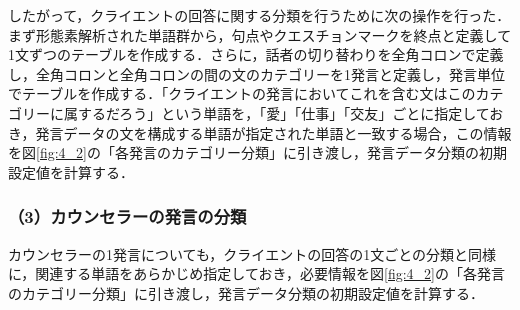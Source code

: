 \documentclass[shuuron]{kuee}
\begin{document}


したがって，クライエントの回答に関する分類を行うために次の操作を行った．まず形態素解析された単語群から，句点やクエスチョンマークを終点と定義して1文ずつのテーブルを作成する．さらに，話者の切り替わりを全角コロンで定義し，全角コロンと全角コロンの間の文のカテゴリーを1発言と定義し，発言単位でテーブルを作成する．「クライエントの発言においてこれを含む文はこのカテゴリーに属するだろう」という単語を，「愛」「仕事」「交友」ごとに指定しておき，発言データの文を構成する単語が指定された単語と一致する場合，この情報を図\ref{fig:4_2}の「各発言のカテゴリー分類」に引き渡し，発言データ分類の初期設定値を計算する．


\subsubsection{（3）カウンセラーの発言の分類}






カウンセラーの1発言についても，クライエントの回答の1文ごとの分類と同様に，関連する単語をあらかじめ指定しておき，必要情報を図\ref{fig:4_2}の「各発言のカテゴリー分類」に引き渡し，発言データ分類の初期設定値を計算する．

\end{document}
